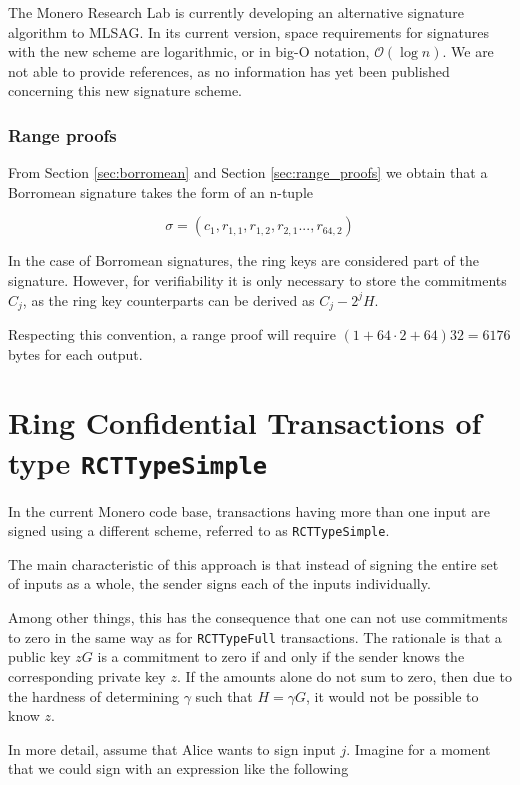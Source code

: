 The Monero Research Lab is currently developing an alternative signature algorithm to MLSAG. 
In its current version, space requirements for signatures with the new scheme are logarithmic, 
or in big-O notation, \(\mathcal{O}(\log n)\).
We are not able to provide references, as no information has yet been published concerning this new signature scheme.


\subsubsection*{Range proofs}
\label{range-proofs-space}

From Section \ref{sec:borromean} and Section \ref{sec:range_proofs} we obtain that a Borromean signature 
takes the form of an n-tuple

\[\sigma = (c_1, r_{1, 1}, r_{1, 2}, r_{2, 1}..., r_{64, 2} )  \]

In the case of Borromean signatures, the ring keys are considered part of the signature.
However, for verifiability it is only necessary to store the commitments \(C_j\), as the
ring key counterparts can be derived as \(C_j - 2^j H\).

Respecting this convention, a range proof will require \( ( 1 + 64 \cdot 2 + 64  ) 32 = 6176\) bytes
for each output.



\section{ Ring Confidential Transactions of type {\tt RCTTypeSimple}}

In the current Monero code base, transactions having more than one input are signed using 
a different scheme, referred to as {\tt RCTTypeSimple}.

The main characteristic of this approach is that instead of signing the entire set of inputs as a whole,
the sender signs each of the inputs individually.

Among other things, this has the consequence that one can not use commitments to zero in the same way as for {\tt RCTTypeFull}
transactions. The rationale is that a public key \(z G\) is a commitment to zero if and only if the sender knows the
corresponding private key \(z\). If the amounts alone do not sum to zero, then due to the hardness of determining
\(\gamma\) such that \(H = \gamma G\),
it would not be possible to know \(z\).

In more detail, assume that Alice  wants to sign input \(j\). 
Imagine for a moment that we could sign with an expression like the following

